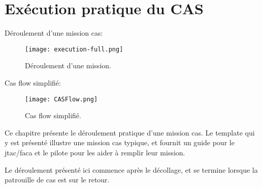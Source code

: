 \chapter{Exécution pratique du CAS}

\begin{center}
\end{center}

\e
    \item Déroulement d'une mission \gls{cas}:
    \begin{figure}[H]
        \texttt{[image: execution-full.png]}
        \caption{Déroulement d'une mission.}
        \label{fig:casflow-full}
    \end{figure}
    \item Cas flow simplifié:
    \begin{figure}[H]
        \texttt{[image: CASFlow.png]}
        \caption{Cas flow simplifié.}
        \label{fig:casflow}
    \end{figure}
\ed

\e
    \item
    Ce chapitre présente le déroulement pratique d’une mission \acrshort{cas}. Le template qui y est présenté illustre une mission \acrshort{cas} typique, et fournit un guide pour le \acrshort{jtac}/\acrshort{faca} et le pilote pour les aider à remplir leur mission.
    \item Le déroulement présenté ici commence après le décollage, et se termine lorsque la patrouille de \acrshort{cas} est sur le retour.
\ed

